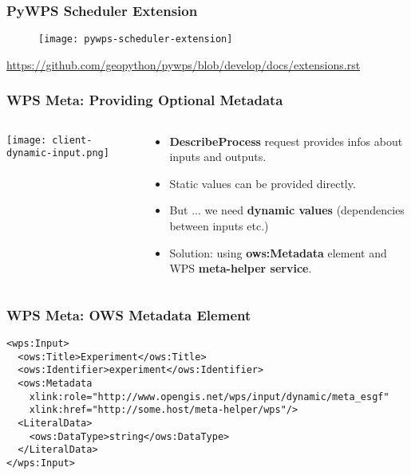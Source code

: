 \documentclass{beamer}
\begin{document}
\begin{frame}
\frametitle<presentation>{PyWPS Scheduler Extension}

  \begin{figure}[ht]
    \centering
    \texttt{[image: pywps-scheduler-extension]}
  \end{figure}

  \centering
  \footnotesize{\url{https://github.com/geopython/pywps/blob/develop/docs/extensions.rst}}

\end{frame}

\begin{frame}
\frametitle<presentation>{WPS Meta: Providing Optional Metadata}

  \begin{columns}[c]
    \begin{column}{.5\textwidth}
      \centering
      \texttt{[image: client-dynamic-input.png]}
    \end{column}
    \begin{column}{.5\textwidth}
      \begin{itemize}
        \item {\bf DescribeProcess} request provides infos about inputs and outputs.
        \item Static values can be provided directly.
        \item But ... we need {\bf dynamic values} (dependencies between inputs etc.)
        \item Solution: using {\bf ows:Metadata} element and WPS {\bf meta-helper service}.
      \end{itemize}
    \end{column}
  \end{columns}

\end{frame}

\begin{frame}[fragile]
\frametitle<presentation>{WPS Meta: OWS Metadata Element}
  \lstset{language=XML}
  {\scriptsize
  \begin{lstlisting}
<wps:Input>
  <ows:Title>Experiment</ows:Title>
  <ows:Identifier>experiment</ows:Identifier>
  <ows:Metadata
    xlink:role="http://www.opengis.net/wps/input/dynamic/meta_esgf"
    xlink:href="http://some.host/meta-helper/wps"/>
  <LiteralData>
    <ows:DataType>string</ows:DataType>
  </LiteralData>
</wps:Input>
  \end{lstlisting}}

\end{frame}
\end{document}
